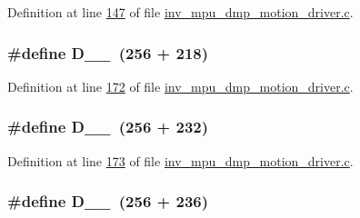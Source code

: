 Definition at line \hyperlink{inv__mpu__dmp__motion__driver_8c_source_l00147}{147} of file \hyperlink{inv__mpu__dmp__motion__driver_8c_source}{inv\+\_\+mpu\+\_\+dmp\+\_\+motion\+\_\+driver.\+c}.

\subsubsection[{\texorpdfstring{D\+\_\+1\+\_\+218}{D_1_218}}]{\setlength{\rightskip}{0pt plus 5cm}\#define D\+\_\+\_~(256 + 218)}\hypertarget{group___d_r_i_v_e_r_s_ga0c4568c70e2cd501e8de6c3147eb0276}{}\label{group___d_r_i_v_e_r_s_ga0c4568c70e2cd501e8de6c3147eb0276}


Definition at line \hyperlink{inv__mpu__dmp__motion__driver_8c_source_l00172}{172} of file \hyperlink{inv__mpu__dmp__motion__driver_8c_source}{inv\+\_\+mpu\+\_\+dmp\+\_\+motion\+\_\+driver.\+c}.

\subsubsection[{\texorpdfstring{D\+\_\+1\+\_\+232}{D_1_232}}]{\setlength{\rightskip}{0pt plus 5cm}\#define D\+\_\+\_~(256 + 232)}\hypertarget{group___d_r_i_v_e_r_s_ga2b58e015c2162382339b7c57607ee32c}{}\label{group___d_r_i_v_e_r_s_ga2b58e015c2162382339b7c57607ee32c}


Definition at line \hyperlink{inv__mpu__dmp__motion__driver_8c_source_l00173}{173} of file \hyperlink{inv__mpu__dmp__motion__driver_8c_source}{inv\+\_\+mpu\+\_\+dmp\+\_\+motion\+\_\+driver.\+c}.

\subsubsection[{\texorpdfstring{D\+\_\+1\+\_\+236}{D_1_236}}]{\setlength{\rightskip}{0pt plus 5cm}\#define D\+\_\+\_~(256 + 236)}\hypertarget{group___d_r_i_v_e_r_s_ga1ac208ac9e1ba17e8b116176c2878068}{}\label{group___d_r_i_v_e_r_s_ga1ac208ac9e1ba17e8b116176c2878068}


